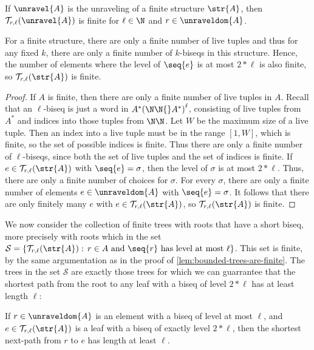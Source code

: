\begin{lemma}\label{lem:bounded-trees-are-finite}
  If $\unravel{A}$ is the unraveling of a finite structure $\str{A}$, then $\mathcal{T}_{r,\ell}(\unravel{A})$ is finite for $\ell \in \N$ and $r \in \unraveldom{A}$.
\end{lemma}
\begin{proofsketch}
  For a finite structure, there are only a finite number of live tuples and thus for any fixed $k$, there are only a finite number of $k$-biseqs in this structure.
  Hence, the number of elements where the level of $\seq{e}$ is at most $2 * \ell$ is also finite, so $\mathcal{T}_{r,\ell}(\str{A})$ is finite.
\end{proofsketch}
\begin{proof}
If $A$ is finite, then there are only a finite number of live tuples in $A$.
Recall that an $\ell$-biseq is just a word in $A^*{(\N\N{}A^{*})}^{\ell}$, consisting of live tuples from $A^{*}$ and indices into those tuples from $\N\N$.
Let $W$ be the maximum size of a live tuple.
Then an index into a live tuple must be in the range $[1,W]$, which is finite, so the set of possible indices is finite.
Thus there are only a finite number of $\ell$-biseqs, since both the set of live tuples and the set of indices is finite.
If $e \in \mathcal{T}_{r,\ell}(\str{A})$ with $\seq{e} = \sigma$, then the level of $\sigma$ is at most $2 * \ell$.
Thus, there are only a finite number of choices for $\sigma$.
For every $\sigma$, there are only a finite number of elements $e \in \unraveldom{A}$ with $\seq{e} = \sigma$.
It follows that there are only finitely many $e$ with $e \in \mathcal{T}_{r,\ell}(\str{A})$, so $\mathcal{T}_{r,\ell}(\str{A})$ is finite.
\end{proof}
\noindent
We now consider the collection of finite trees with roots that have a short biseq, more precisely with roots which in the set $\mathcal{S} = \left\{ \mathcal{T}_{r,\ell}(\str{A}):\, r \in A \text{ and } \seq{r}\ \text{has level at most $\ell$}\right\}$.
This set is finite, by the same argumentation as in the proof of \cref{lem:bounded-trees-are-finite}.
The trees in the set $\mathcal{S}$ are exactly those trees for which we can guarrantee that the shortest path from the root to any leaf with a biseq of level $2 * \ell$ has at least length $\ell$:
\begin{lemma}\label{lem:bounded-trees-shortest-next-path}
  If $r \in \unraveldom{A}$ is an element with a biseq of level at most $\ell$, and $e \in \mathcal{T}_{r,\ell}(\str{A})$ is a leaf with a biseq of exactly level $2 * \ell$, then the shortest next-path from $r$ to $e$ has length at least $\ell$.
\end{lemma}
